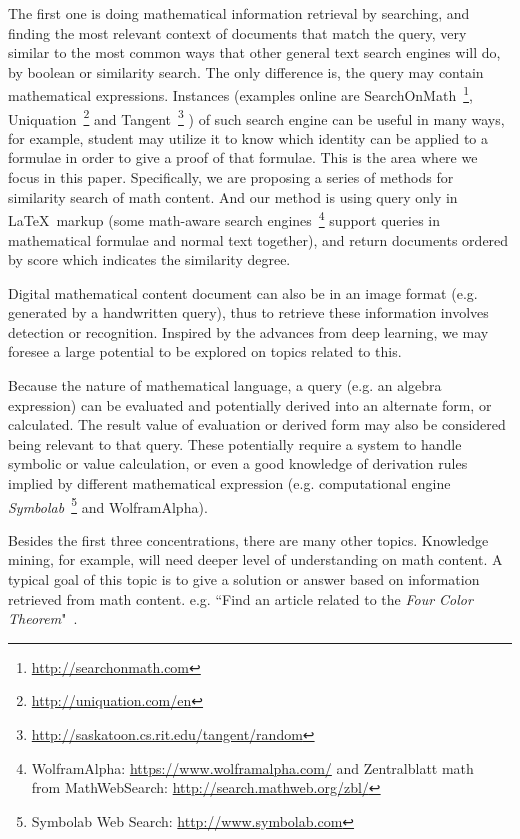 The first one is doing mathematical information retrieval by searching, and finding the most relevant context of documents that match the query, very similar to the most common ways that other general text search engines will do, by boolean or similarity search. 
The only difference is, the query may contain mathematical expressions. 
Instances 
(examples online are  
SearchOnMath~\footnote{\url{http://searchonmath.com}},
Uniquation~\footnote{\url{http://uniquation.com/en}}
and 
Tangent~\footnote{\url{http://saskatoon.cs.rit.edu/tangent/random}}
)
of such search engine can be useful in many ways, for example, student may utilize it to know which identity can be applied to a formulae in order to give a proof of that formulae.
This is the area where we focus in this paper. Specifically, we are proposing a series of methods for similarity search of math content. And our method is using query only in \LaTeX\ markup 
(some math-aware search engines~\footnote{WolframAlpha: \url{https://www.wolframalpha.com/} and Zentralblatt math \\from MathWebSearch: \url{http://search.mathweb.org/zbl/}} support queries in mathematical formulae and normal text together), and return documents ordered by score which indicates the similarity degree. 

Digital mathematical content document can also be in an image format (e.g. generated by a handwritten query), thus to retrieve these information involves detection or recognition. Inspired by the advances from deep learning, we may foresee a large potential to be explored on topics related to this. 

Because the nature of mathematical language, a query (e.g. an algebra expression) can be evaluated and potentially derived into an alternate form, or calculated. 
The result value of evaluation or derived form may also be considered being relevant to that query. 
These potentially require a system to handle symbolic or value calculation, or even a good knowledge of derivation rules implied by different mathematical expression
(e.g. computational engine \textit{Symbolab}~\footnote{Symbolab Web Search: \url{http://www.symbolab.com}} and WolframAlpha).

Besides the first three concentrations, there are many other topics. Knowledge mining, for example, will need deeper level of understanding on math content. A typical goal of this topic is to give a solution or answer based on information retrieved from math content. e.g. ``Find an article related to the \textit{Four Color Theorem}"~\cite{ntcirtopic}.

